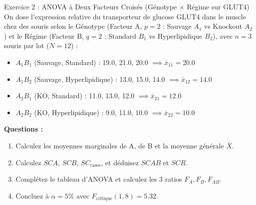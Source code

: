 \documentclass[11pt,a4paper]{article}
\begin{document}
\begin{exercicebox}{Exercice 2 : ANOVA à Deux Facteurs Croisés (Génotype $\times$ Régime sur GLUT4)}
On dose l'expression relative du transporteur de glucose GLUT4 dans le muscle chez des souris selon le Génotype (Facteur A, $p=2$ : Sauvage $A_1$ vs Knockout $A_2$) et le Régime (Facteur B, $q=2$ : Standard $B_1$ vs Hyperlipidique $B_2$), avec $n = 3$ souris par lot ($N = 12$) :
\begin{itemize}
  \item $A_1 B_1$ (Sauvage, Standard) : 19.0, 21.0, 20.0 $\implies \bar{x}_{11} = 20.0$
  \item $A_1 B_2$ (Sauvage, Hyperlipidique) : 13.0, 15.0, 14.0 $\implies \bar{x}_{12} = 14.0$
  \item $A_2 B_1$ (KO, Standard) : 11.0, 13.0, 12.0 $\implies \bar{x}_{21} = 12.0$
  \item $A_2 B_2$ (KO, Hyperlipidique) : 9.0, 11.0, 10.0 $\implies \bar{x}_{22} = 10.0$
\end{itemize}
\textbf{Questions :}
\begin{enumerate}[label=\textbf{\alph*.}]
  \item Calculez les moyennes marginales de A, de B et la moyenne générale $\bar{X}$.
  \item Calculez $SCA$, $SCB$, $SC_{\text{cases}}$, et déduisez $SCAB$ et $SCR$.
  \item Complétez le tableau d'ANOVA et calculez les 3 ratios $F_A, F_B, F_{AB}$.
  \item Concluez à $\alpha = 5\%$ avec $F_{\text{critique}}(1, 8) = 5.32$.
\end{enumerate}
\end{exercicebox}
\end{document}
